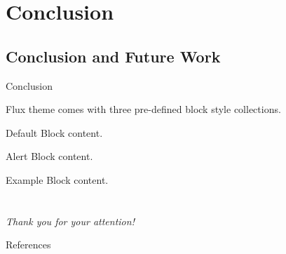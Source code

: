 \documentclass[8pt, aspectratio=169]{beamer}
\begin{document}
\section{Conclusion}

\subsection{Conclusion and Future Work}

\begin{frame}{Conclusion}
    
  Flux theme comes with three pre-defined block style collections.\\
  
  \centering
	\begin{minipage}[b]{0.5\textwidth}

	  \begin{block}{Default}
        Block content.
      \end{block}

      \begin{alertblock}{Alert}
        Block content.
      \end{alertblock}

      \begin{exampleblock}{Example}
        Block content.
      \end{exampleblock}      
      
	\end{minipage}
\end{frame}

\section{}
\begin{frame}{}
    \centering \Large
    \emph{Thank you for your attention!}
\end{frame}

\begin{frame}[allowframebreaks]{References}

  
  

\end{frame}
\end{document}
